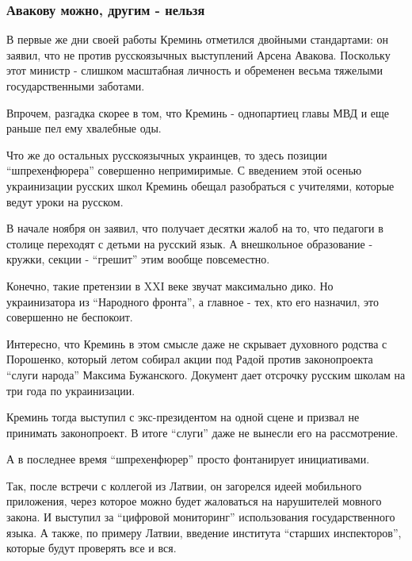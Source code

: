  
 
 
 
 

\subsubsection{Авакову можно, другим - нельзя}

В первые же дни своей работы Креминь отметился двойными стандартами: он заявил,
что не против русскоязычных выступлений Арсена Авакова. Поскольку этот министр
- слишком масштабная личность и обременен весьма тяжелыми государственными
заботами. 

Впрочем, разгадка скорее в том, что Креминь - однопартиец главы МВД и еще
раньше пел ему хвалебные оды. 

Что же до остальных русскоязычных украинцев, то здесь позиции \enquote{шпрехенфюрера}
совершенно непримиримые. С введением этой осенью украинизации русских школ
Креминь обещал разобраться с учителями, которые ведут уроки на русском.

В начале ноября он заявил, что получает десятки жалоб на то, что педагоги в
столице переходят с детьми на русский язык. А внешкольное образование - кружки,
секции - \enquote{грешит} этим вообще повсеместно. 

Конечно, такие претензии в XXІ веке звучат максимально дико. Но украинизатора
из \enquote{Народного фронта}, а главное - тех, кто его назначил, это совершенно не
беспокоит. 

Интересно, что Креминь в этом смысле даже не скрывает духовного родства с
Порошенко, который летом собирал акции под Радой против законопроекта
\enquote{слуги народа} Максима Бужанского. Документ дает отсрочку русским школам на
три года по украинизации.

Креминь тогда выступил с экс-президентом на одной сцене и призвал не принимать
законопроект. В итоге \enquote{слуги} даже не вынесли его на рассмотрение. 

А в последнее время \enquote{шпрехенфюрер} просто фонтанирует инициативами.

Так, после встречи с коллегой из Латвии, он загорелся идеей мобильного
приложения, через которое можно будет жаловаться на нарушителей мовного закона.
И выступил за \enquote{цифровой мониторинг} использования государственного языка. А
также, по примеру Латвии, введение института \enquote{старших инспекторов}, которые
будут проверять все и вся. 


